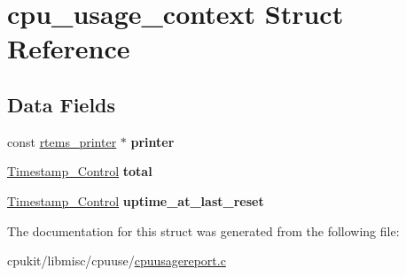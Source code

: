 \hypertarget{structcpu__usage__context}{}\section{cpu\+\_\+usage\+\_\+context Struct Reference}
\label{structcpu__usage__context}
\subsection*{Data Fields}
\begin{DoxyCompactItemize}
\item 
\mbox{\label{structcpu__usage__context_ad27da8931640532a74194573edc9f3ec}} 
const \mbox{\hyperlink{structrtems__printer}{rtems\+\_\+printer}} $\ast$ {\bfseries printer}
\item 
\mbox{\label{structcpu__usage__context_a2b32e7284bbf721927160ef2eeb97437}} 
\mbox{\hyperlink{group__SuperCoreTimeStamp_ga8508036506d5211c98844c88045e2410}{Timestamp\+\_\+\+Control}} {\bfseries total}
\item 
\mbox{\label{structcpu__usage__context_a40f5f14e963a22985f75fac7f9e3503f}} 
\mbox{\hyperlink{group__SuperCoreTimeStamp_ga8508036506d5211c98844c88045e2410}{Timestamp\+\_\+\+Control}} {\bfseries uptime\+\_\+at\+\_\+last\+\_\+reset}
\end{DoxyCompactItemize}


The documentation for this struct was generated from the following file\+:\begin{DoxyCompactItemize}
\item 
cpukit/libmisc/cpuuse/\mbox{\hyperlink{cpuusagereport_8c}{cpuusagereport.\+c}}\end{DoxyCompactItemize}
